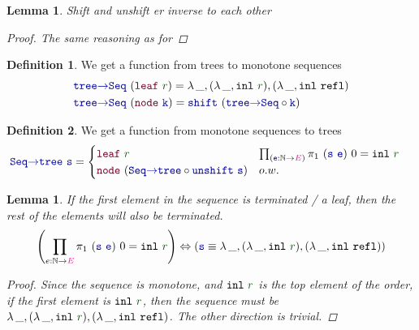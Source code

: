 \documentclass[twoside,11pt,openright]{report}
\theoremstyle{plain} %
\newtheorem{lem}[thm]{Lemma}
\theoremstyle{definition}
\newtheorem{defn}{Definition}[section]
\theoremstyle{remark}
\newcommand*{\term}[1]{\textcolor{green!30!black}{#1}} %
\newcommand*{\type}[1]{\textcolor{magenta!90!black}{#1}}
\newcommand*{\function}[1]{\textcolor{blue!60!black}{\ensuremath{\mathtt{#1}}}}
\newcommand*{\constructor}[1]{\textcolor{purple!60!black}{\ensuremath{\mathtt{#1}}}}
\begin{document}
\begin{lem}
  Shift and unshift er inverse to each other
  \begin{proof}
    The same reasoning as for 
  \end{proof}
\end{lem}
\begin{defn}
  We get a function from trees to monotone sequences
  \begin{equation}
    \begin{aligned}
      &\function{tree{\rightarrow}Seq}~(\constructor{leaf}~\term{r}) = \lambda\,\_, (\lambda\,\_, \mathtt{inl}~\term{r}) , (\lambda\,\_, \mathtt{inl}~\mathtt{refl}) \\
      &\function{tree{\rightarrow}Seq}~(\constructor{node}~\function{k}) = \function{shift}~(\function{tree{\rightarrow}Seq} \circ \function{k})
    \end{aligned}
  \end{equation}
\end{defn}
\begin{defn}
  We get a function from monotone sequences to trees
  \begin{equation}
    \begin{aligned}
      &\function{Seq{\rightarrow}tree}~\function{s} = \begin{cases} \constructor{leaf}~\term{r} & \prod_{(\function{e} : \mathbb{N} \rightarrow \type{E})} \pi_1~(\function{s}~\function{e})~0 = \mathtt{inl}~\term{r} \\ \constructor{node}~(\function{Seq{\rightarrow}tree} \circ \function{unshift}~\function{s}) & o.w.  \end{cases}
    \end{aligned}
  \end{equation}
\end{defn}
\begin{lem}
  \label{lem:seq-first-is-leaf}
  If the first element in the sequence is terminated / a leaf, then the rest of the elements will also be terminated.
  \begin{equation}
    \left(\prod_{e : \mathbb{N} \rightarrow \type{E}} \pi_1~(\function{s}~\function{e})~0 = \mathtt{inl}~\term{r}\right) \Leftrightarrow \left(\function{s} \equiv \lambda\,\_,(\lambda\,\_,\mathtt{inl}~\term{r}),(\lambda\,\_,\mathtt{inl}~\mathtt{refl})\right)
  \end{equation}
  \begin{proof}
    Since the sequence is monotone, and \(\mathtt{inl}~\term{r}\) is the top element of the order, if the first element is \(\mathtt{inl}~\term{r}\), then the sequence must be \(\lambda\,\_,(\lambda\,\_,\mathtt{inl}~\term{r}),(\lambda\,\_,\mathtt{inl}~\mathtt{refl})\). The other direction is trivial.
  \end{proof}
\end{lem}
\end{document}

